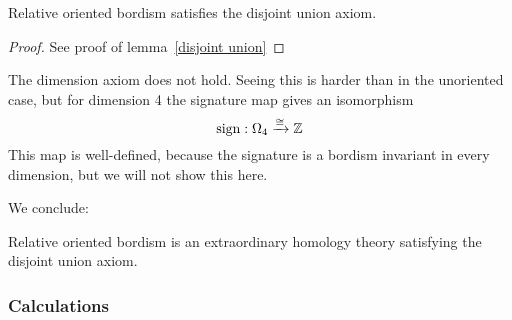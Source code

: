 \documentclass[a4paper,12pt]{article}
\begin{document}
\begin{lemma}
    Relative oriented bordism satisfies the disjoint union axiom.
\end{lemma}

\begin{proof}
    See proof of lemma\ \ref{disjoint union}
\end{proof}


\begin{remark}
    The dimension axiom does not hold. Seeing this is harder than in the unoriented case, but for dimension 4 the signature map gives an isomorphism
    \[\mathrm{sign}:\Omega_4\xrightarrow{\cong}\mathbb{Z}\]
    This map is well-defined, because the signature is a bordism invariant in every dimension, but we will not show this here.
\end{remark}

We conclude:
\begin{theorem}
    Relative oriented bordism is an extraordinary homology theory satisfying the disjoint union axiom.
\end{theorem}

\subsubsection{Calculations}
\end{document}
